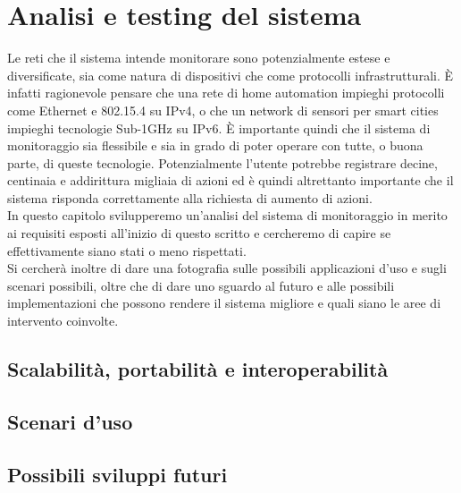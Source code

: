 \chapter{Analisi e testing del sistema}
Le reti che il sistema intende monitorare sono potenzialmente estese e diversificate, sia come natura di dispositivi che come protocolli infrastrutturali. È infatti ragionevole pensare che una rete di home automation impieghi protocolli come Ethernet e 802.15.4 su IPv4, o che un network di sensori per smart cities impieghi tecnologie Sub-1GHz su IPv6. È importante quindi che il sistema di monitoraggio sia flessibile e sia in grado di poter operare con tutte, o buona parte, di queste tecnologie. Potenzialmente l'utente potrebbe registrare decine, centinaia e addirittura migliaia di azioni ed è quindi altrettanto importante che il sistema risponda correttamente alla richiesta di aumento di azioni.
\\In questo capitolo svilupperemo un'analisi del sistema di monitoraggio in merito ai requisiti esposti all'inizio di questo scritto e cercheremo di capire se effettivamente siano stati o meno rispettati.
\\Si cercherà inoltre di dare una fotografia sulle possibili applicazioni d'uso e sugli scenari possibili, oltre che di dare uno sguardo al futuro e alle possibili implementazioni che possono rendere il sistema migliore e quali siano le aree di intervento coinvolte.

\section{Scalabilità, portabilità e interoperabilità}

\section{Scenari d'uso}

\section{Possibili sviluppi futuri}

